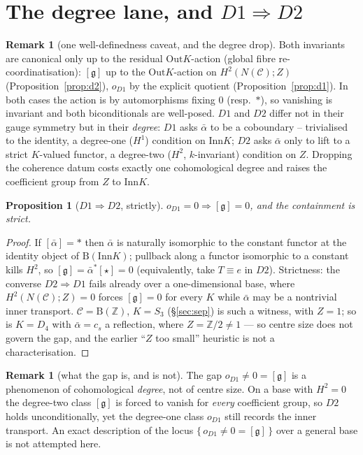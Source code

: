 \documentclass[11pt]{article}
\newtheorem{proposition}[theorem]{Proposition}
\theoremstyle{definition}
\newtheorem{remark}[theorem]{Remark}
\newcommand{\C}{\mathcal{C}}
\newcommand{\Z}{\mathbb{Z}}
\newcommand{\Inn}{\mathrm{Inn}}
\newcommand{\Out}{\mathrm{Out}}
\newcommand{\gerbe}{\mathfrak{g}}
\newcommand{\abar}{\bar{\alpha}}
\newcommand{\B}{\mathrm{B}}
\begin{document}
\section{The degree lane, and $D1\Rightarrow D2$}\label{sec:degree}

\begin{remark}[one well-definedness caveat, and the degree drop]\label{rem:degree}
Both invariants are canonical only up to the residual $\Out K$-action (global fibre
re-coordinatisation): $[\gerbe]$ up to the $\Out K$-action on $H^2(N(\C);Z)$
(Proposition~\ref{prop:d2}), $o_{D1}$ by the explicit quotient (Proposition~\ref{prop:d1}).
In both cases the action is by automorphisms fixing $0$ (resp.\ $*$), so vanishing is
invariant and both biconditionals are well-posed. $D1$ and $D2$ differ not in their gauge
symmetry but in their \emph{degree}: $D1$ asks $\abar$ to be a coboundary -- trivialised to
the identity, a degree-one ($H^1$) condition on $\Inn K$; $D2$ asks $\abar$ only to lift to
a strict $K$-valued functor, a degree-two ($H^2$, $k$-invariant) condition on $Z$. Dropping
the coherence datum costs exactly one cohomological degree and raises the coefficient group
from $Z$ to $\Inn K$.
\end{remark}

\begin{proposition}[$D1\Rightarrow D2$, strictly]\label{prop:implies}
$o_{D1}=0\Rightarrow[\gerbe]=0$, and the containment is strict.
\end{proposition}

\begin{proof}
If $[\abar]=*$ then $\abar$ is naturally isomorphic to the constant functor at the identity
object of $\B(\Inn K)$; pullback along a functor isomorphic to a constant kills $H^2$, so
$[\gerbe]=\abar^{*}[\star]=0$ (equivalently, take $T\equiv e$ in $D2$). Strictness: the
converse $D2\Rightarrow D1$ fails already over a one-dimensional base, where
$H^2(N(\C);Z)=0$ forces $[\gerbe]=0$ for every $K$ while $\abar$ may be a nontrivial inner
transport. $\C=\B(\Z)$, $K=S_3$ (\S\ref{sec:sep}) is such a witness, with $Z=1$; so is
$K=D_4$ with $\abar=c_s$ a reflection, where $Z=\Z/2\neq 1$ --- so centre size does not
govern the gap, and the earlier ``$Z$ too small'' heuristic is not a characterisation.
\end{proof}

\begin{remark}[what the gap is, and is not]\label{rem:notcentre}
The gap $o_{D1}\neq 0=[\gerbe]$ is a phenomenon of cohomological \emph{degree}, not of
centre size. On a base with $H^2=0$ the degree-two class $[\gerbe]$ is forced to vanish for
\emph{every} coefficient group, so $D2$ holds unconditionally, yet the degree-one class
$o_{D1}$ still records the inner transport. An exact description of the locus
$\{\,o_{D1}\neq 0=[\gerbe]\,\}$ over a general base is not attempted here.
\end{remark}
\end{document}
